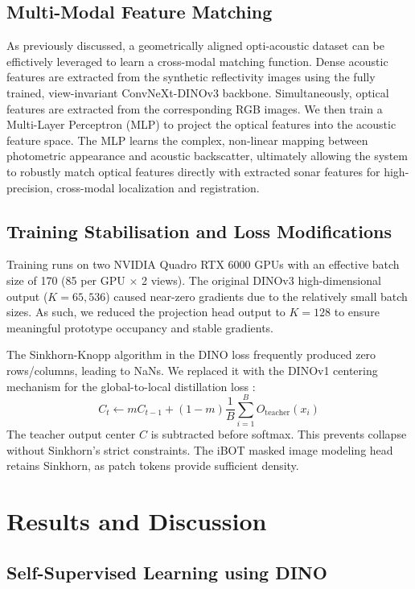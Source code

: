 \documentclass[12pt]{article}
\begin{document}
\subsection{Multi-Modal Feature Matching}
As previously discussed, a geometrically aligned opti-acoustic dataset can be effictively leveraged to learn a cross-modal matching function. Dense acoustic features are extracted from the synthetic reflectivity images using the fully trained, view-invariant ConvNeXt-DINOv3 backbone. Simultaneously, optical features are extracted from the corresponding RGB images. We then train a Multi-Layer Perceptron (MLP) to project the optical features into the acoustic feature space. The MLP learns the complex, non-linear mapping between photometric appearance and acoustic backscatter, ultimately allowing the system to robustly match optical features directly with extracted sonar features for high-precision, cross-modal localization and registration.

\subsection{Training Stabilisation and Loss Modifications}
Training runs on two NVIDIA Quadro RTX 6000 GPUs with an effective batch size of 170 (85 per GPU $\times$ 2 views). The original DINOv3 high-dimensional output ($K=65{,}536$) caused near-zero gradients due to the relatively small batch sizes. As such, we reduced the projection head output to $K=128$ to ensure meaningful prototype occupancy and stable gradients.

The Sinkhorn-Knopp algorithm in the DINO loss frequently produced zero rows/columns, leading to NaNs. We replaced it with the DINOv1 centering mechanism for the global-to-local distillation loss \cite{caron2021}:
\begin{equation}
    C_{t} \leftarrow m C_{t-1} + (1-m) \frac{1}{B} \sum_{i=1}^{B} O_{\text{teacher}}(x_i)
\end{equation}
The teacher output center $C$ is subtracted before softmax. This prevents collapse without Sinkhorn's strict constraints. The iBOT masked image modeling head retains Sinkhorn, as patch tokens provide sufficient density.

\section{Results and Discussion}

\subsection{Self-Supervised Learning using DINO}
\end{document}

